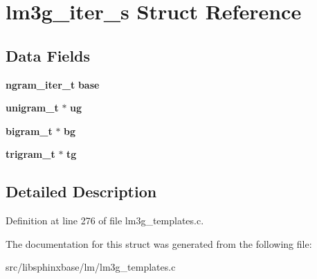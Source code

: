 \section{lm3g\-\_\-iter\-\_\-s \-Struct \-Reference}
\label{structlm3g__iter__s}
\subsection*{\-Data \-Fields}
\begin{DoxyCompactItemize}
\item 
{\bf ngram\-\_\-iter\-\_\-t} {\bfseries base}\label{structlm3g__iter__s_ae24753ad344180c9b3a6162444ecbc3c}

\item 
{\bf unigram\-\_\-t} $\ast$ {\bfseries ug}\label{structlm3g__iter__s_a8a4ce73a4ae6d75de2682c84ae345b1b}

\item 
{\bf bigram\-\_\-t} $\ast$ {\bfseries bg}\label{structlm3g__iter__s_a484e0af0540b59dced50e8f39a7bf691}

\item 
{\bf trigram\-\_\-t} $\ast$ {\bfseries tg}\label{structlm3g__iter__s_af8d3b111d9a5f98c1e2830866c72658a}

\end{DoxyCompactItemize}


\subsection{\-Detailed \-Description}


\-Definition at line 276 of file lm3g\-\_\-templates.\-c.



\-The documentation for this struct was generated from the following file\-:\begin{DoxyCompactItemize}
\item 
src/libsphinxbase/lm/lm3g\-\_\-templates.\-c\end{DoxyCompactItemize}
